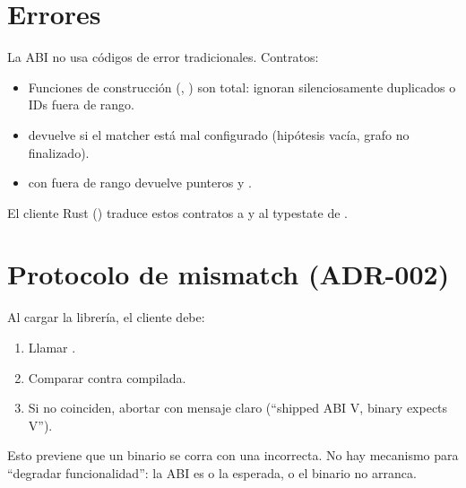 \section{Errores}

La ABI no usa códigos de error tradicionales. Contratos:

\begin{itemize}
    \item Funciones de construcción (, )
    son total: ignoran silenciosamente duplicados o IDs fuera de
    rango.
    \item {} devuelve  si el matcher
    está mal configurado (hipótesis vacía, grafo no finalizado).
    \item {} con  fuera de rango
    devuelve punteros  y .
\end{itemize}

El cliente Rust () traduce estos contratos
a  y al typestate de .

\section{Protocolo de mismatch (ADR-002)}

Al cargar la librería, el cliente debe:

\begin{enumerate}
    \item Llamar .
    \item Comparar contra  compilada.
    \item Si no coinciden, abortar con mensaje claro (``shipped
    ABI V, binary expects V'').
\end{enumerate}

Esto previene que un binario se corra con una 
incorrecta. No hay mecanismo para ``degradar funcionalidad'': la
ABI es o la esperada, o el binario no arranca.
